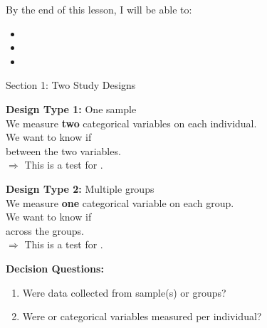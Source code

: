 \documentclass[10pt]{article}
\begin{document}
\namedateperiod

\vspace{0.1in}

\begin{objectivebox}
By the end of this lesson, I will be able to:
\begin{itemize}
    \item \writeline
    \item \writeline
    \item \writeline
\end{itemize}
\end{objectivebox}

\vspace{0.08in}

\begin{vocabbox}
\end{vocabbox}

\vspace{0.08in}

\begin{notesbox}{Section 1: Two Study Designs}
\begin{minipage}[t]{0.47\linewidth}
    \textbf{Design Type 1:} One sample \\
    We measure \textbf{two} categorical variables on each individual.\\
    We want to know if \blank{3.5cm} \\
    between the two variables.\\[6pt]
    $\Rightarrow$ This is a test for \blank{3cm}.
\end{minipage}
\hfill
\begin{minipage}[t]{0.47\linewidth}
    \textbf{Design Type 2:} Multiple groups \\
    We measure \textbf{one} categorical variable on each group.\\
    We want to know if \blank{3.5cm} \\
    across the groups.\\[6pt]
    $\Rightarrow$ This is a test for \blank{3cm}.
\end{minipage}

\vspace{0.1in}
\textbf{Decision Questions:}
\begin{enumerate}
    \item Were data collected from \blank{2.5cm} sample(s) or \blank{2.5cm} groups?
    \item Were \blank{1.5cm} or \blank{1.5cm} categorical variables measured per individual?
\end{enumerate}
\end{notesbox}
\end{document}
